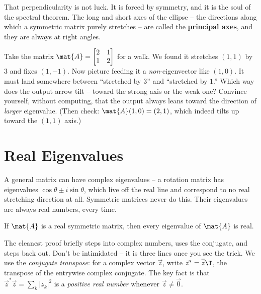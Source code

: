 That perpendicularity is not luck. It is forced by symmetry, and it is the soul
of the spectral theorem. The long and short axes of the ellipse -- the directions
along which a symmetric matrix purely stretches -- are called the \textbf{principal
axes}, and they are always at right angles.

\begin{walkbox}
Take the matrix $\mat{A}=\begin{bmatrix}2&1\\1&2\end{bmatrix}$ for a walk. We
found it stretches $(1,1)$ by $3$ and fixes $(1,-1)$. Now picture feeding it a
\emph{non}-eigenvector like $(1,0)$. It must land somewhere between ``stretched by
$3$'' and ``stretched by $1$.'' Which way does the output arrow tilt -- toward the
strong axis or the weak one? Convince yourself, without computing, that the output
always leans toward the direction of \emph{larger} eigenvalue. (Then check:
$\mat{A}(1,0)=(2,1)$, which indeed tilts up toward the $(1,1)$ axis.)
\end{walkbox}

\section{Real Eigenvalues}
\label{ch26:real-eigenvalues}

A general matrix can have complex eigenvalues -- a rotation matrix has eigenvalues
$\cos\theta \pm i\sin\theta$, which live off the real line and correspond to no
real stretching direction at all. Symmetric matrices never do this. Their
eigenvalues are always real numbers, every time.

\begin{theorem}
\label{ch26:thm-real}
If $\mat{A}$ is a real symmetric matrix, then every eigenvalue of $\mat{A}$ is
real.
\end{theorem}

The cleanest proof briefly steps into complex numbers, uses the conjugate, and
steps back out. Don't be intimidated -- it is three lines once you see the trick.
We use the \emph{conjugate transpose}: for a complex vector $\vec{z}$, write
$\vec{z}^{*} = \overline{\vec{z}}\T$, the transpose of the entrywise complex
conjugate. The key fact is that $\vec{z}^{*}\vec{z} = \sum_k |z_k|^2$ is a
\emph{positive real number} whenever $\vec{z}\neq\vec{0}$.

